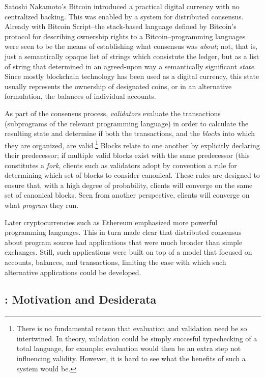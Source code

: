 Satoshi Nakamoto's Bitcoin introduced a practical digital currency with no
centralized backing.\cite{Nakamoto2008} This was enabled by a system for
distributed consensus. Already with Bitcoin Script--the stack-based language
defined by Bitcoin's protocol for describing ownership rights to a
Bitcoin--programming languages were seen to be the means of establishing what
consensus was \textit{about}; not, that is, just a semantically opaque list of
strings which consistute the ledger, but as a list of string that determined in
an agreed-upon way a semantically significant \textit{state}. Since mostly
blockchain technology has been used as a digital currency, this state usually
represents the ownership of designated coins, or in an alternative formulation,
the balances of individual accounts.

As part of the consensus process, \textit{validators} evaluate the transactions
(subprograms of the relevant programming language) in order to calculate the
resulting state and determine if both the transactions, and the \textit{blocks}
into which they are organized, are valid.\footnote{There is no fundamental
reason that evaluation and validation need be so intertwined. In theory,
validation could be simply succesful typechecking of a total language, for
example; evaluation would then be an extra step not influencing validity.
However, it is hard to see what the benefits of such a system would be.} Blocks
relate to one another by explicitly declaring their predecessor; if
multiple valid blocks exist with the same predecessor (this constitutes a
\textit{fork}, clients such as validators adopt by convention a rule for
determining which set of blocks to consider canonical. These rules are designed
to ensure that, with a high degree of probability, clients will converge on the
same set of canonical blocks. Seen from another perspective, clients will
converge on what \textit{program} they run.

Later cryptocurrencies such as Ethereum emphasized more powerful programming
languages. This in turn made clear that distributed consensus about program
source had applications that were much broader than simple exchanges. Still,
such applications were built on top of a model that focused on accounts,
balances, and transactions, limiting the ease with which such alternative
applications could be developed.



\subsection{\rad: Motivation and Desiderata}

